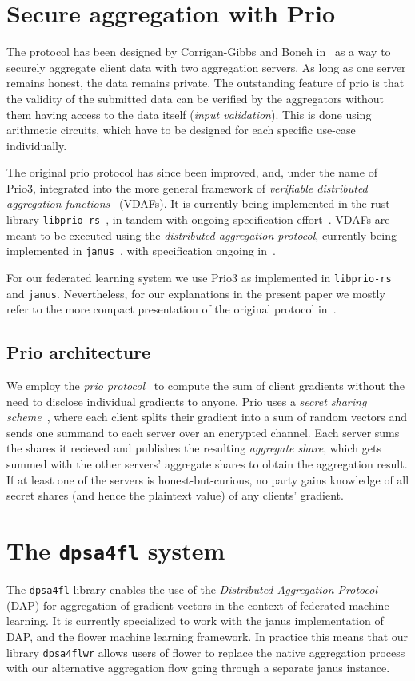 \documentclass{article}
\begin{document}
\section{Secure aggregation with Prio}
The protocol has been designed by Corrigan-Gibbs and Boneh in~\cite{prio} as a
way to securely aggregate client data with two aggregation servers. As long as
one server remains honest, the data remains private. The outstanding feature of
prio is that the validity of the submitted data can be verified by the
aggregators without them having access to the data itself (\textit{input
  validation}). This is done using arithmetic circuits, which have to be
designed for each specific use-case individually.

The original prio protocol has since been improved, and, under the name of Prio3, integrated into the
more general framework of \textit{verifiable distributed aggregation
  functions}~\cite{vdaf} (VDAFs). It is currently being implemented in the rust library
\texttt{libprio-rs}~\cite{libprio-rs}, in tandem with ongoing specification effort~\cite{vdaf-draft}.
VDAFs are meant to be executed using the \textit{distributed aggregation
  protocol}, currently being implemented in \texttt{janus}~\cite{janus}, with
specification ongoing in~\cite{dap-draft}.

For our federated learning system we use Prio3
as implemented in \texttt{libprio-rs} and \texttt{janus}. Nevertheless, for our
explanations in the present paper
we mostly refer to the more compact presentation of the original protocol in~\cite{prio}.

\subsection{Prio architecture}
We employ the \textit{prio protocol}~\cite{prio} to compute the sum of client gradients without the need to disclose individual gradients to anyone. Prio uses a \textit{secret sharing scheme}~\cite[Step 1 of scheme on page 3]{prio}, where each client splits their gradient into a sum of random vectors and sends one summand to each server over an encrypted channel. Each server sums the shares it recieved and publishes the resulting \textit{aggregate share}, which gets summed with the other servers' aggregate shares to obtain the aggregation result. If at least one of the servers is honest-but-curious, no party gains knowledge of all secret shares (and hence the plaintext value) of any clients' gradient.


\section{The \texttt{dpsa4fl} system}
The \texttt{dpsa4fl} library enables the use of the \textit{Distributed Aggregation Protocol} (DAP) for
aggregation of gradient vectors in the context of federated machine learning. It
is currently specialized to work with the janus implementation of DAP,
and the flower machine learning framework.
In practice this means that our library \texttt{dpsa4flwr} allows users of flower
to replace the native aggregation process with our alternative aggregation flow
going through a separate janus instance.
\end{document}
